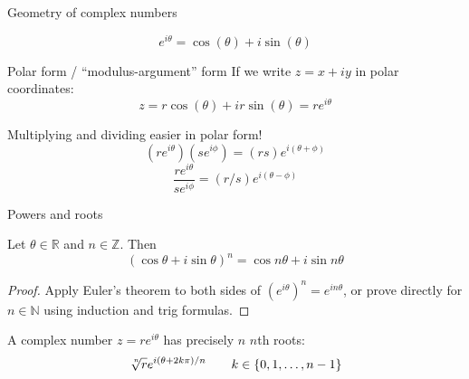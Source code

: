 \documentclass{beamer}
\newcommand{\Z}{\mathbb{Z}}
\newcommand{\R}{\mathbb{R}}
\newcommand{\N}{\mathbb{N}}
\begin{document}
\begin{frame}{Geometry of complex numbers}
  \begin{theorem}[Euler]
    $$e^{i\theta}=\cos(\theta)+i\sin(\theta)$$
  \end{theorem}
  \begin{block}{Polar form / ``modulus-argument'' form}
  If we write $z=x+iy$ in polar coordinates:
  $$z=r\cos(\theta)+ir\sin(\theta)=r e^{i\theta}$$
\end{block}
  \begin{block}{Multiplying and dividing easier in polar form!}
  $$(re^{i\theta})(se^{i\phi})=(rs)e^{i(\theta+\phi)}$$
  $$\frac{re^{i\theta}}{se^{i\phi}}=(r/s)e^{i(\theta-\phi)}$$
  \end{block}
  \end{frame}
\begin{frame}{Powers and roots}
  \begin{theorem}[De Moivre] Let $\theta\in\R$ and $n\in \Z$.  Then
    $$(\cos\theta+i\sin\theta)^n=\cos n\theta+i\sin n\theta$$
  \end{theorem}
  \begin{proof} Apply Euler's theorem to both sides of $(e^{i\theta})^n=e^{in\theta}$, or prove directly for $n\in \N$ using induction and trig formulas.   \end{proof}
  
   \begin{theorem}
    A complex number $z=re^{i\theta}$ has precisely $n$ $n$th roots:
    $$\sqrt[\leftroot{-2}\uproot{2}n]{r}e^{i(\theta+2k\pi)/n} \quad \quad k\in\{0,1,\dots,n-1\}$$
    \end{theorem}


\end{frame}
\end{document}
